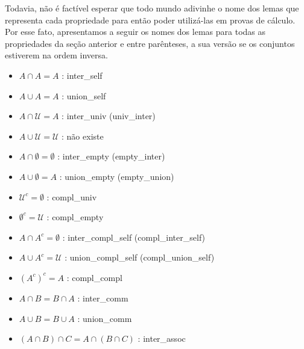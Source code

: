   Todavia, não é factível esperar que todo mundo adivinhe o nome dos lemas que representa cada propriedade para então poder utilizá-las em provas de cálculo. Por esse fato, apresentamos a seguir os nomes dos lemas para todas as propriedades da seção anterior e entre parênteses, a sua versão se os conjuntos estiverem na ordem inversa.

  \begin{itemize}
    \item $A \cap A = A$ : {\selectfont inter\_self}
    \item $A \cup A = A$ : {\selectfont union\_self}
    \item $A \cap \mathcal U = A$ : {\selectfont inter\_univ} ({\selectfont univ\_inter})
    \item $A \cup \mathcal U = \mathcal U$ : não existe
    \item $A \cap \emptyset = \emptyset$ : {\selectfont inter\_empty} ({\selectfont empty\_inter})
    \item $A \cup \emptyset = A$ : {\selectfont union\_empty} ({\selectfont empty\_union})
    \item $\mathcal U ^c = \emptyset$ : {\selectfont compl\_univ}
    \item $\emptyset ^c = \mathcal U$ : {\selectfont compl\_empty}
    \item $A \cap A^c = \emptyset$ : {\selectfont inter\_compl\_self} ({\selectfont compl\_inter\_self})
    \item $A \cup A^c = \mathcal U$ : {\selectfont union\_compl\_self} ({\selectfont compl\_union\_self})
    \item $(A^c)^c = A$ : {\selectfont compl\_compl}
    \item $A \cap B = B \cap A$ : {\selectfont inter\_comm}
    \item $A \cup B = B \cup A$ : {\selectfont union\_comm}
    \item $(A \cap B) \cap C = A \cap (B \cap C)$ : {\selectfont inter\_assoc}

\end{itemize}
